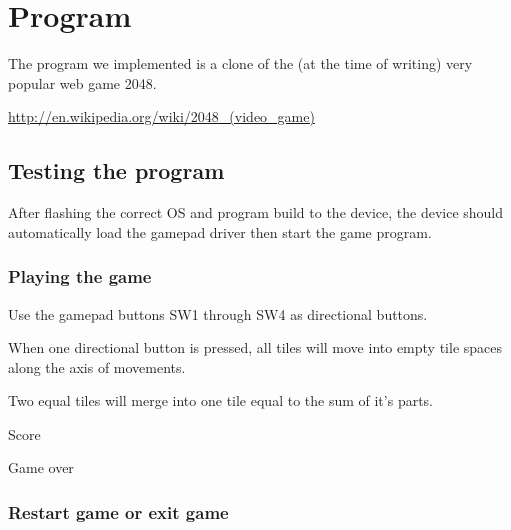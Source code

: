 \section{Program}
The program we implemented is a clone of the (at the time of writing) very popular web game 2048. 

\url{http://en.wikipedia.org/wiki/2048\_(video\_game)}

\subsection{Testing the program}
After flashing the correct OS and program build to the device, the device should automatically load the gamepad driver then start the game program.

\subsubsection{Playing the game}
Use the gamepad buttons SW1 through SW4 as directional buttons.

When one directional button is pressed, all tiles will move into empty tile spaces along the axis of movements.

Two equal tiles will merge into one tile equal to the sum of it's parts.

Score

Game over

\subsubsection{Restart game or exit game}

